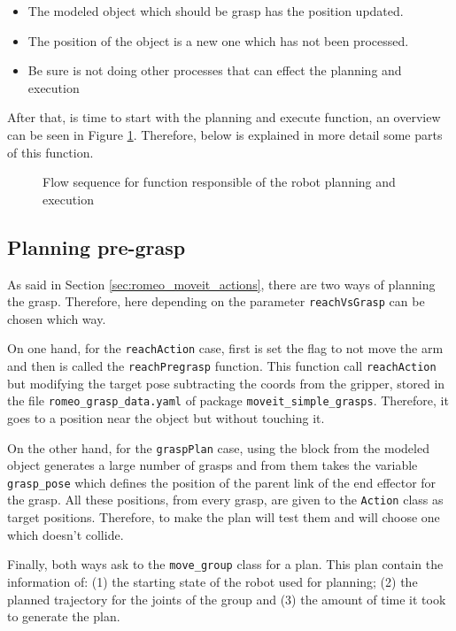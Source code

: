 \documentclass[12pt,a4paper,final,twoside,openright]{report}
\begin{document}
\begin{itemize}
\item The modeled object which should be grasp has the position updated.
\item The position of the object is a new one which has not been processed.
\item Be sure is not doing other processes that can effect the planning and execution
\end{itemize}

After that, is time to start with the planning and execute function, an overview can be seen in Figure \ref{fig:plan_execute_function_flow}. Therefore, below is explained in more detail some parts of this function.

\begin{figure}[!h]
\centering

\caption{Flow sequence for function responsible of the robot planning and execution\label{fig:plan_execute_function_flow}}
\end{figure}

\vspace{-10pt}
\subsection{Planning pre-grasp}
\label{sec:planning_pregrasp}

As said in Section \ref{sec:romeo_moveit_actions}, there are two ways of planning the grasp. Therefore, here depending on the parameter \texttt{reachVsGrasp} can be chosen which way. 

On one hand, for the \texttt{reachAction} case, first is set the flag to not move the arm and then is called the \texttt{reachPregrasp} function. This function call \texttt{reachAction} but modifying the target pose subtracting the coords from the gripper, stored in the file \texttt{romeo\_grasp\_data.yaml} of package \texttt{moveit\_simple\_grasps}. Therefore, it goes to a position near the object but without touching it.

On the other hand, for the \texttt{graspPlan} case, using the block from the modeled object generates a large number of grasps and from them takes the variable \texttt{grasp\_pose} which defines the position of the parent link of the end effector for the grasp. All these positions, from every grasp, are given to the \texttt{Action} class as target positions. Therefore, to make the plan will test them and will choose one which doesn't collide.

Finally, both ways ask to the \texttt{move\_group} class for a plan. This plan contain the information of: (1) the starting state of the robot used for planning; (2) the planned trajectory for the joints of the group and (3) the amount of time it took to generate the plan.
\end{document}
